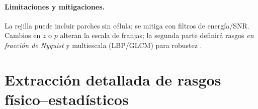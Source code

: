 \paragraph{Limitaciones y mitigaciones.} La rejilla puede incluir parches sin célula; se mitiga con filtros de energía/SNR. Cambios en $z$ o $p$ alteran la escala de franjas; la segunda parte definirá rasgos \emph{en fracción de Nyquist} y multiescala (LBP/GLCM) para robustez \cite{Chen2022Photonics}.



\section{Extracción detallada de rasgos físico–estadísticos}
\label{sec:features}

